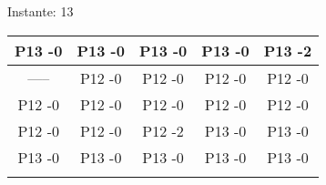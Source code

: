 \documentclass[10pt,a4paper]{article}
\begin{document}
\pagebreak
\begin{center}

Instante: 13

\hfill 
\hfill 
\hfill 
\break 
\begin{tabular}	{ccccc}
\hline  P13 -0 &   P13 -0 &   P13 -0 &   P13 -0 &   P13 -2 &  \\\hline  ----- &   P12 -0 &   P12 -0 &   P12 -0 &   P12 -0 &  \\\hline  P12 -0 &   P12 -0 &   P12 -0 &   P12 -0 &   P12 -0 &  \\\hline  P12 -0 &   P12 -0 &   P12 -2 &   P13 -0 &   P13 -0 &  \\\hline  P13 -0 &   P13 -0 &   P13 -0 &   P13 -0 &   P13 -0 &  \\\hfill 
\hfill 
\hfill 
\break 
\end{tabular}
\end{center}
\pagebreak
\end{document}
